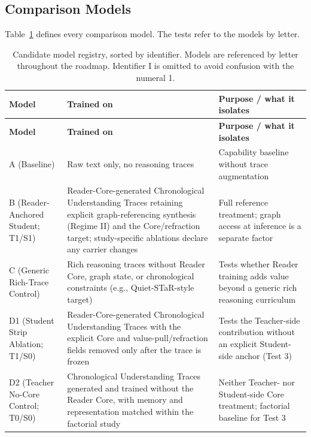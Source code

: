 \documentclass[11pt]{article}
\begin{document}
\subsection{Comparison Models}\label{sec:model-registry}

Table~\ref{tab:model-registry} defines every comparison model. The tests refer
to the models by letter.

\begingroup
\footnotesize
\setlength{\tabcolsep}{3pt}
\begin{longtable}{
  >{\raggedright\arraybackslash}p{3.1cm}
  >{\raggedright\arraybackslash}p{5.5cm}
  >{\raggedright\arraybackslash}p{6.4cm}}
\caption{Candidate model registry, sorted by identifier. Models are referenced by letter throughout the roadmap. Identifier I is omitted to avoid confusion with the numeral 1.}
\label{tab:model-registry}\\
\toprule
\textbf{Model} & \textbf{Trained on} & \textbf{Purpose / what it isolates} \\
\midrule
\endfirsthead
\toprule
\textbf{Model} & \textbf{Trained on} & \textbf{Purpose / what it isolates} \\
\midrule
\endhead
\bottomrule
\endlastfoot
        A (Baseline) & Raw text only, no reasoning traces & Capability baseline without trace augmentation \\
        B (Reader-Anchored Student; T1/S1) & Reader-Core-generated Chronological Understanding Traces retaining explicit graph-referencing synthesis (Regime II) and the Core/refraction target; study-specific ablations declare any carrier changes & Full reference treatment; graph access at inference is a separate factor \\
        C (Generic Rich-Trace Control) & Rich reasoning traces without Reader Core, graph state, or chronological constraints (e.g., Quiet-STaR-style target) & Tests whether Reader training adds value beyond a generic rich reasoning curriculum \\
	        D1 (Student Strip Ablation; T1/S0) & Reader-Core-generated Chronological Understanding Traces with the explicit Core and value-pull/refraction fields removed only after the trace is frozen & Tests the Teacher-side contribution without an explicit Student-side anchor (Test 3) \\
        D2 (Teacher No-Core Control; T0/S0) & Chronological Understanding Traces generated and trained without the Reader Core, with memory and representation matched within the factorial study & Neither Teacher- nor Student-side Core treatment; factorial baseline for Test 3 \\

\end{longtable}
\end{document}
